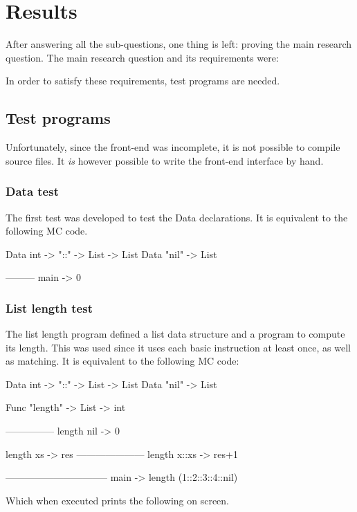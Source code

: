 \section{Results}\label{results}
After answering all the sub-questions, one thing is left: proving the main research question.
The main research question and its requirements were:



In order to satisfy these requirements, test programs are needed.

\subsection{Test programs}
Unfortunately, since the front-end was incomplete, it is not possible to compile source files.
It \textit{is} however possible to write the front-end interface by hand.

\subsubsection{Data test}
The first test was developed to test the Data declarations.
It is equivalent to the following MC code.

\begin{MC}
Data int -> "::" -> List -> List
Data "nil" -> List

---------
main -> 0
\end{MC}

\subsubsection{List length test}
The list length program defined a list data structure and a program to compute its length.
This was used since it uses each basic instruction at least once, as well as matching.
It is equivalent to the following MC code:

\begin{MC}
Data int -> "::" -> List -> List
Data "nil" -> List

Func "length" -> List -> int

---------------
length nil -> 0

length xs -> res
---------------------
length x::xs -> res+1

--------------------------------
main -> length (1::2::3::4::nil)
\end{MC}

Which when executed prints the following on screen.

